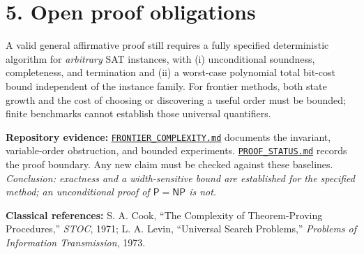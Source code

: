 \documentclass[11pt,a4paper]{article}
\newcommand{\NP}{\mathsf{NP}}
\newcommand{\PP}{\mathsf{P}}
\begin{document}
\section*{5. Open proof obligations}
A valid general affirmative proof still requires a fully specified deterministic algorithm for \emph{arbitrary} SAT instances, with (i) unconditional soundness, completeness, and termination and (ii) a worst-case polynomial total bit-cost bound independent of the instance family. For frontier methods, both state growth and the cost of choosing or discovering a useful order must be bounded; finite benchmarks cannot establish those universal quantifiers.

\textbf{Repository evidence:} \href{https://github.com/n0711/P_EQUALS_NP/blob/main/FRONTIER_COMPLEXITY.md}{\texttt{FRONTIER\_COMPLEXITY.md}} documents the invariant, variable-order obstruction, and bounded experiments. \href{https://github.com/n0711/P_EQUALS_NP/blob/main/PROOF_STATUS.md}{\texttt{PROOF\_STATUS.md}} records the proof boundary. Any new claim must be checked against these baselines.\\
\textit{Conclusion: exactness and a width-sensitive bound are established for the specified method; an unconditional proof of $\PP=\NP$ is not.}

\vspace{1mm}
{\footnotesize\textbf{Classical references:} S. A. Cook, ``The Complexity of Theorem-Proving Procedures,'' \emph{STOC}, 1971; L. A. Levin, ``Universal Search Problems,'' \emph{Problems of Information Transmission}, 1973.}
\end{document}
